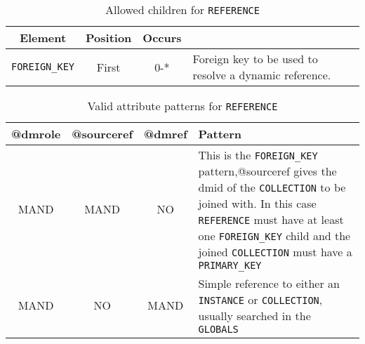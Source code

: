 \begin{table}[!htbp]
\small
\centering
\begin{tabulary}{\linewidth}{|c |c |c|J|}
    \hline 
        \textbf{Element} &
        \textbf{Position} &
        \textbf{Occurs} &
        \\
    \hline      \hline  
        \texttt{FOREIGN\_KEY}  &        
        First &           
        0-* &
        Foreign key to be used to resolve a dynamic reference.\\
    \hline 
\end{tabulary}
     \caption{Allowed children for \texttt{REFERENCE}} 
     \label{tbl:reference-chilren}
\end{table}


\begin{table}[!htbp]
\small
\centering
\begin{tabulary}{\linewidth}{|c|c|c|J|}
    \hline 
        \textbf{@dmrole} &
        \textbf{@sourceref} &
        \textbf{@dmref} &
        \textbf{Pattern}\\
    \hline      \hline  
        MAND &           
        MAND &           
        NO &           
        This is the \texttt{FOREIGN\_KEY} pattern,@sourceref gives the dmid of the \texttt{COLLECTION} to be joined with. In this case \texttt{REFERENCE} must have at least one \texttt{FOREIGN\_KEY} child and the joined \texttt{COLLECTION} must have a \texttt{PRIMARY\_KEY}\\
    \hline   
        MAND &           
        NO &           
        MAND &           
        Simple reference to either an \texttt{INSTANCE} or \texttt{COLLECTION}, usually searched in the \texttt{GLOBALS}\\
   \hline 
\end{tabulary}
     \caption{Valid attribute patterns for  \texttt{REFERENCE}}
     \label{tbl:reference-pattern}
\end{table}

